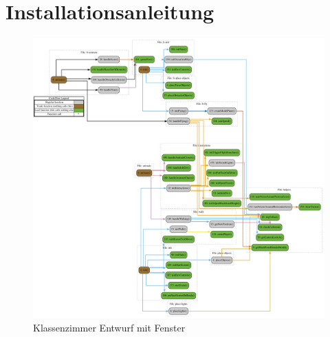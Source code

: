 \section{Installationsanleitung}
\begin{figure}[H]
  \centering
  \includegraphics[width=1\textwidth]{images/function-call-graph.pdf}
  \caption{Klassenzimmer Entwurf mit Fenster}
  \label{fig:Entwurf}
\end{figure}\noindent